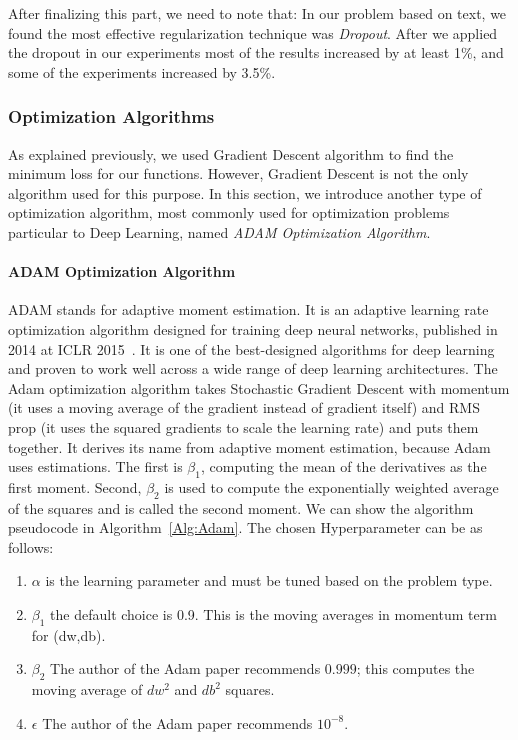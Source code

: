 After finalizing this part, we need to note that: In our problem based on text, we found the most effective regularization technique was \textit{Dropout}. After we applied the dropout in our experiments most of the results increased by at least 1\%, and some of the experiments increased by 3.5\%.

\subsubsection{Optimization Algorithms}
As explained previously, we used Gradient Descent algorithm to find the minimum loss for our functions. However, Gradient Descent is not the only algorithm used for this purpose. In this section, we introduce another type of optimization algorithm, most commonly used for optimization problems particular to Deep Learning, named \textit{ADAM Optimization Algorithm}.

\paragraph{ADAM Optimization Algorithm}
ADAM stands for adaptive moment estimation. It is an adaptive learning rate optimization algorithm designed for training deep neural networks, published in 2014 at ICLR 2015~\cite{Adam_2014}. It is one of the best-designed algorithms for deep learning and proven to work well across a wide range of deep learning architectures. The Adam optimization algorithm takes Stochastic Gradient Descent with momentum (it uses a moving average of the gradient instead of gradient itself) and RMS prop (it uses the squared gradients to scale the learning rate) and puts them together. It derives its name from adaptive moment estimation, because Adam uses estimations. The first is $\beta_1$, computing the mean of the derivatives as the first moment. Second, $\beta_2$ is used to compute the exponentially weighted average of the squares and is called the second moment. We can show the algorithm pseudocode in Algorithm~\ref{Alg:Adam}. The chosen Hyperparameter can be as follows:

\begin{enumerate}
\item $\alpha$ is the learning parameter and must be tuned based on the problem type.
\item $\beta_1$ the default choice is 0.9. This is the moving averages in momentum term for (dw,db).
\item $\beta_2$ The author of the Adam paper recommends $0.999$; this computes the moving average of $dw^2$ and $db^2$ squares.
\item $\epsilon$ The author of the Adam paper recommends $10^{-8}$.
\end{enumerate}%

